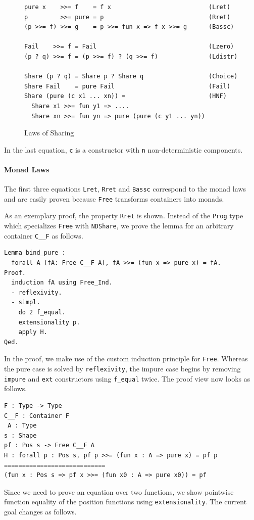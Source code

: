 \documentclass[a4paper, 11pt, fleqn, twoside, abstract=on]{scrreprt}
\newcommand{\cinl}[1]{\texttt{#1}}
\begin{document}
\begin{figure}[H]
\begin{verbatim}
pure x    >>= f    = f x                           (Lret)
p         >>= pure = p                             (Rret)
(p >>= f) >>= g    = p >>= fun x => f x >>= g      (Bassc)

Fail    >>= f = Fail                               (Lzero)
(p ? q) >>= f = (p >>= f) ? (q >>= f)              (Ldistr)

Share (p ? q) = Share p ? Share q                  (Choice)
Share Fail    = pure Fail                          (Fail)
Share (pure (c x1 ... xn)) =                       (HNF)
  Share x1 >>= fun y1 => ....
  Share xn >>= fun yn => pure (pure (c y1 ... yn))
\end{verbatim}
\caption{Laws of Sharing}
\label{fig:laws}
\end{figure}
\noindent
In the last equation, \cinl{c} is a constructor with \cinl{n} non-deterministic components.

\paragraph{Monad Laws}
The first three equations \cinl{Lret}, \cinl{Rret} and \cinl{Bassc} correspond to the monad laws and are easily proven because \cinl{Free} transforms containers into monads.

As an exemplary proof, the property \cinl{Rret} is shown.
Instead of the \cinl{Prog} type which specializes \cinl{Free} with \cinl{NDShare}, we prove the lemma for an arbitrary container \cinl{C__F} as follows.

\begin{verbatim}
Lemma bind_pure :
  forall A (fA: Free C__F A), fA >>= (fun x => pure x) = fA.
Proof.
  induction fA using Free_Ind.
  - reflexivity.
  - simpl.
    do 2 f_equal.
    extensionality p.
    apply H.
Qed.
\end{verbatim}

In the proof, we make use of the custom induction principle for \cinl{Free}.
Whereas the pure case is solved by \cinl{reflexivity}, the impure case begins by removing \cinl{impure} and \cinl{ext} constructors using \cinl{f_equal} twice.
The proof view now looks as follows.

\begin{verbatim}
F : Type -> Type
C__F : Container F
 A : Type
s : Shape
pf : Pos s -> Free C__F A
H : forall p : Pos s, pf p >>= (fun x : A => pure x) = pf p
============================
(fun x : Pos s => pf x >>= (fun x0 : A => pure x0)) = pf
\end{verbatim}
\noindent
Since we need to prove an equation over two functions, we show pointwise function equality of the position functions using \cinl{extensionality}.
The current goal changes as follows.
\end{document}
